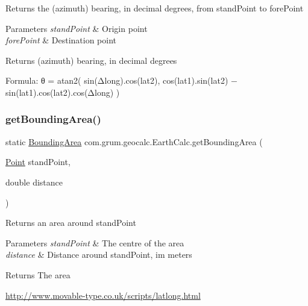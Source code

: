 Returns the (azimuth) bearing, in decimal degrees, from stand\+Point to fore\+Point


\begin{DoxyParams}{Parameters}
{\em stand\+Point} & Origin point \\
\hline
{\em fore\+Point} & Destination point \\
\hline
\end{DoxyParams}
\begin{DoxyReturn}{Returns}
(azimuth) bearing, in decimal degrees 
\end{DoxyReturn}
Formula\+: θ = atan2( sin(Δlong).cos(lat2), cos(lat1).sin(lat2) − sin(lat1).cos(lat2).cos(Δlong) )\mbox{\label{classcom_1_1grum_1_1geocalc_1_1_earth_calc_a0a74a2e87389d9c0358d0ea7c58951fb}} 
\subsubsection{\texorpdfstring{get\+Bounding\+Area()}{getBoundingArea()}}
{\footnotesize\ttfamily static \mbox{\hyperlink{classcom_1_1grum_1_1geocalc_1_1_bounding_area}{Bounding\+Area}} com.\+grum.\+geocalc.\+Earth\+Calc.\+get\+Bounding\+Area (\begin{DoxyParamCaption}\item[{\mbox{\hyperlink{classcom_1_1grum_1_1geocalc_1_1_point}{Point}}}]{stand\+Point,  }\item[{double}]{distance }\end{DoxyParamCaption})\hspace{0.3cm}{\ttfamily [static]}}

Returns an area around stand\+Point


\begin{DoxyParams}{Parameters}
{\em stand\+Point} & The centre of the area \\
\hline
{\em distance} & Distance around stand\+Point, im meters \\
\hline
\end{DoxyParams}
\begin{DoxyReturn}{Returns}
The area
\end{DoxyReturn}
\mbox{\hyperlink{}{http\+://www.\+movable-\/type.\+co.\+uk/scripts/latlong.\+html}}\mbox{\label{classcom_1_1grum_1_1geocalc_1_1_earth_calc_acb9d37a15f23017544401934adc110cf}} 
